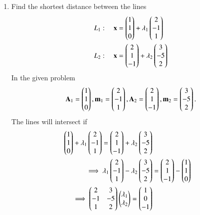 \begin{enumerate}[label=\arabic*.,ref=\thesubsection.\theenumi]
\item Find the shortest distance between the lines 
\begin{align}
L_1: \quad \mathbf{x} &= \begin{pmatrix}1\\1\\0\end{pmatrix} + \lambda_1\begin{pmatrix}2 \\ -1 \\1\end{pmatrix}
\\
L_2: \quad \mathbf{x} &= \begin{pmatrix}2\\1\\-1\end{pmatrix} + \lambda_2\begin{pmatrix}3 \\ -5 \\2\end{pmatrix}
\end{align}
\label{prob:line_dist_skew}
%
\solution  In the given  problem
\begin{align}
\mathbf{A}_1= \begin{pmatrix}1\\1\\0\end{pmatrix}, \mathbf{m}_1=\begin{pmatrix}2 \\ -1 \\1\end{pmatrix},
\mathbf{A}_2= \begin{pmatrix}2\\1\\-1\end{pmatrix}, \mathbf{m}_2 =\begin{pmatrix}3 \\ -5 \\2\end{pmatrix}.
\end{align}
%
The lines will intersect if
%
\begin{align}
\myvec{1\\1\\0} + \lambda_1\myvec{2 \\ -1 \\1}
= \myvec{2\\1\\-1} + \lambda_2\myvec{3 \\ -5 \\2}
\\
\implies \lambda_1\myvec{2 \\ -1 \\1} - \lambda_2\myvec{3 \\ -5 \\2} &= \myvec{2\\1\\-1}-\myvec{1\\1\\0}  
\\
\implies \myvec{2 & 3 \\ -1 & -5 \\ 1 & 2}\myvec{\lambda_1\\ \lambda_2} = \myvec{1\\0\\-1}

\end{align}
\end{enumerate}
